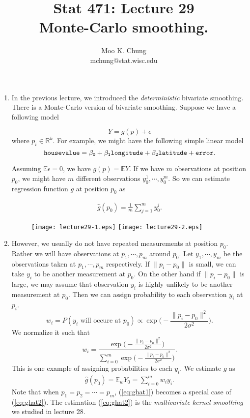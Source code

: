 \documentclass[11pt,twocolumn]{article} %
\newcommand{\bq}{\begin{eqnarray}}
\newcommand{\eq}{\end{eqnarray}}
\begin{document}
\title{Stat 471: Lecture 29\\
Monte-Carlo smoothing.}
\author{Moo K. Chung\\
mchung@stat.wisc.edu}
\maketitle \thispagestyle{empty}
\begin{enumerate}
\item In the previous lecture, we introduced the {\em
deterministic} bivariate smoothing. There is a Monte-Carlo version
of bivariate smoothing.
Suppose we have a following model

$$Y = g(p) + \epsilon$$
where $p_i \in \mathbb{R}^k$. For example, we might have the
following simple linear model $$\tt{house value} =
\beta_0+\beta_1\tt{longitude} + \beta_2 \tt{latitude} +
\tt{error}.$$

Assuming $\mathbb{E} \epsilon =0$, we have $g(p) = \mathbb{E} Y$.
If we have $m$ observations at position $p_0$, we might have $m$
different observations $y_0^1,\cdots, y_0^m$. So we can estimate
regression function $g$ at position $p_0$ as

\bq\widehat g(p_0) = \frac{1}{m}\sum_{j=1}^m
y_0^j.\label{eq:ghat1}\eq

\begin{figure}
\centering
\renewcommand{\baselinestretch}{1}
\texttt{[image: lecture29-1.eps]}
\texttt{[image: lecture29-2.eps]}
\end{figure}
\item However, we usually do not have repeated measurements at
position $p_0$. Rather we will have observations at $p_1,\cdots,
p_m$ around $p_0$. Let $y_1,\cdots, y_m$ be the observations taken
at $p_1, \cdots, p_m$ respectively. If $\|p_i -p_0\|$ is small, we
can take $y_i$ to be another measurement at $p_0$. On the other
hand if $\|p_i - p_0\|$ is large, we may assume that observation
$y_i$ is highly unlikely to be another measurement at $p_0$. Then
we can assign probability to each observation $y_i$ at $p_i$.
$$w_i = P(y_i \mbox{ will occure at } p_0) \propto \exp \big(
-\frac{\|p_i -p_0\|^2}{2\sigma^2}\big).$$ We normalize it such
that
$$w_i = \frac{\exp \big(-\frac{\|p_i -p_0\|^2}{2\sigma^2}\big)}{ \sum_{i=0}^m \exp\big(
-\frac{\|p_i -p_0\|^2}{2\sigma^2}\big)}.$$ This is one example of
assigning probabilities to each $y_i$. We estimate $g$ as \bq
\widehat g(p_0) = \mathbb{E}_w Y_0 =\sum_{i=0}^m
 w_iy_i.\label{eq:ghat2}\eq Note that when $p_1=p_2=\cdots=p_m$,
(\ref{eq:ghat1}) becomes a special case of (\ref{eq:ghat2}). The
estimation (\ref{eq:ghat2}) is the {\em multivariate kernel
smoothing} we studied in lecture 28.


\end{enumerate}
\end{document}

